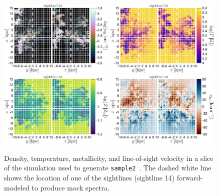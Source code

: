 \documentclass[fleqn,usenatbib]{mnras}
\begin{document}
\begin{figure}
    \centering
    \includegraphics[width=0.49\textwidth]{figures/sample2/projections/density_projection_maps_SL_14.jpg}
    \includegraphics[width=0.49\textwidth]{figures/sample2/projections/temperature_projection_maps_SL_14.jpg} \\
    \includegraphics[width=0.49\textwidth]{figures/sample2/projections/metallicity_projection_maps_SL_14.jpg}
    \includegraphics[width=0.49\textwidth]{figures/sample2/projections/velocity_projection_maps_SL_14.jpg}
    \caption{
    Density, temperature, metallicity, and line-of-sight velocity in a slice of the simulation used to generate \texttt{sample2}~\citep{mandelker2020Instability}.
    The dashed white line shows the location of one of the sightlines (sightline 14) forward-modeled to produce mock spectra.
    }
    \label{f: sample2 ray 14}
\end{figure}
\end{document}
